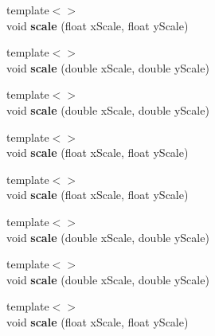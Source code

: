 \begin{DoxyCompactItemize}
\item 
\hypertarget{class_box_ad827b74de4047e4452d4c9231ffd2e4f}{
{\footnotesize template$<$$>$ }\\void {\bfseries scale} (float xScale, float yScale)}
\label{class_box_ad827b74de4047e4452d4c9231ffd2e4f}

\item 
\hypertarget{class_box_a925d4ac6fe269c65b630be2c75b505c5}{
{\footnotesize template$<$$>$ }\\void {\bfseries scale} (double xScale, double yScale)}
\label{class_box_a925d4ac6fe269c65b630be2c75b505c5}

\item 
\hypertarget{class_box_a20af7b40edd61556f1d5cf74c66a3d4d}{
{\footnotesize template$<$$>$ }\\void {\bfseries scale} (double xScale, double yScale)}
\label{class_box_a20af7b40edd61556f1d5cf74c66a3d4d}

\item 
\hypertarget{class_box_a3e569579282f21474f44a67eb3a27128}{
{\footnotesize template$<$$>$ }\\void {\bfseries scale} (float xScale, float yScale)}
\label{class_box_a3e569579282f21474f44a67eb3a27128}

\item 
\hypertarget{class_box_ad827b74de4047e4452d4c9231ffd2e4f}{
{\footnotesize template$<$$>$ }\\void {\bfseries scale} (float xScale, float yScale)}
\label{class_box_ad827b74de4047e4452d4c9231ffd2e4f}

\item 
\hypertarget{class_box_a925d4ac6fe269c65b630be2c75b505c5}{
{\footnotesize template$<$$>$ }\\void {\bfseries scale} (double xScale, double yScale)}
\label{class_box_a925d4ac6fe269c65b630be2c75b505c5}

\item 
\hypertarget{class_box_a20af7b40edd61556f1d5cf74c66a3d4d}{
{\footnotesize template$<$$>$ }\\void {\bfseries scale} (double xScale, double yScale)}
\label{class_box_a20af7b40edd61556f1d5cf74c66a3d4d}

\item 
\hypertarget{class_box_a3e569579282f21474f44a67eb3a27128}{
{\footnotesize template$<$$>$ }\\void {\bfseries scale} (float xScale, float yScale)}
\label{class_box_a3e569579282f21474f44a67eb3a27128}


\end{DoxyCompactItemize}
